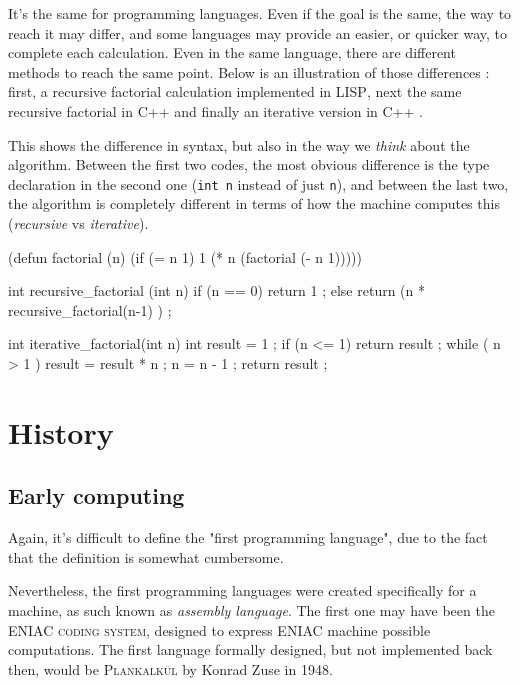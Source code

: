 \documentclass[a4paper]{article}
\newcommand{\cpp}{%
\textsc{C++}%
}
\begin{document}
It's the same for programming languages. Even if the goal is the same, the way to reach it may differ, and some languages may provide an easier, or quicker way, to complete each calculation. Even in the same language, there are different methods to reach the same point. Below is an illustration of those differences : first, a recursive factorial calculation implemented in \textsc{LISP}, next the same recursive factorial in \cpp and finally an iterative version in \cpp.


This shows the difference in syntax, but also in the way we \emph{think} about the algorithm. Between the first two codes, the most obvious difference is the type declaration in the second one ({\tt int n} instead of just {\tt n}), and between the last two, the algorithm is completely different in terms of how the machine computes this (\emph{recursive} vs \emph{iterative}).

\begin{clcode}
(defun factorial (n)
  (if (= n 1)
      1
      (* n (factorial (- n 1)))))
\end{clcode}
\begin{cppcode}
int recursive_factorial (int n) {
	if (n == 0) {
		return 1 ;
	} else {
		return (n * recursive_factorial(n-1) ) ;
	}
}
\end{cppcode}
\begin{cppcode}
int iterative_factorial(int n) {
	int result = 1 ;
	if (n <= 1) { return result ; }
	while ( n > 1 ) {
		result = result * n ;
		n = n - 1 ;
	}
	return result ;
}
\end{cppcode}
\pagebreak

\section{History}
\subsection{Early computing}
Again, it's difficult to define the "first programming language", due to the fact that the definition is somewhat cumbersome. 

Nevertheless, the first programming languages were created specifically for a machine, as such known as \emph{assembly language}.  The first one may have been the \textsc{ENIAC coding system}, designed to express ENIAC machine possible computations. The first language formally designed, but not implemented back then, would be \textsc{Plankalk\"ul} by Konrad Zuse in 1948.\cite{wiki:plankalkul}
\end{document}
